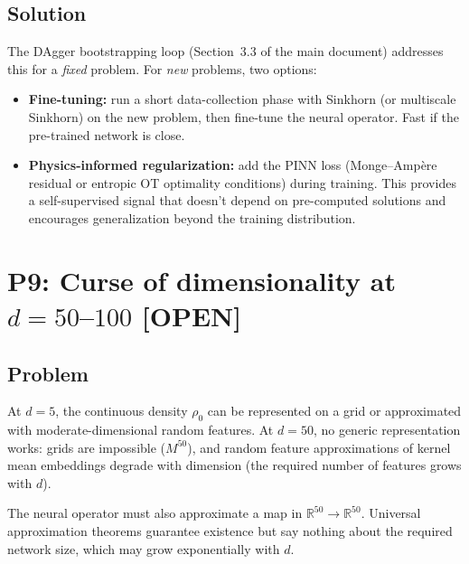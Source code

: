 \documentclass[11pt]{article}
\newcommand{\RR}{\mathbb{R}}
\newcommand{\statusopen}{\textcolor{open}{\textbf{[OPEN]}}}
\begin{document}
\subsection*{Solution}
The DAgger bootstrapping loop (Section~3.3 of the main document) addresses this for a \emph{fixed} problem. For \emph{new} problems, two options:
\begin{itemize}[nosep,leftmargin=1.5em]
    \item \textbf{Fine-tuning:} run a short data-collection phase with Sinkhorn (or multiscale Sinkhorn) on the new problem, then fine-tune the neural operator. Fast if the pre-trained network is close.
    \item \textbf{Physics-informed regularization:} add the PINN loss (Monge--Amp\`ere residual or entropic OT optimality conditions) during training. This provides a self-supervised signal that doesn't depend on pre-computed solutions and encourages generalization beyond the training distribution.
\end{itemize}

\section{P9: Curse of dimensionality at $d = 50$--$100$ \statusopen}

\subsection*{Problem}
At $d = 5$, the continuous density $\rho_0$ can be represented on a grid or approximated with moderate-dimensional random features. At $d = 50$, no generic representation works: grids are impossible ($M^{50}$), and random feature approximations of kernel mean embeddings degrade with dimension (the required number of features grows with $d$).

The neural operator must also approximate a map in $\RR^{50} \to \RR^{50}$. Universal approximation theorems guarantee existence but say nothing about the required network size, which may grow exponentially with $d$.
\end{document}
